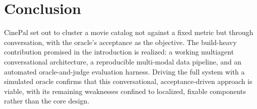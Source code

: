\section{Conclusion}\label{sec:conclusion}
CinePal set out to cluster a movie catalog not against a fixed metric but through conversation, with the oracle's acceptance as the objective.
The build-heavy contribution promised in the introduction is realized: a working multiagent conversational architecture, a reproducible multi-modal data pipeline, and an automated oracle-and-judge evaluation harness. 
Driving the full system with a simulated oracle confirms that this conversational, acceptance-driven approach is viable, with its remaining weaknesses confined to localized, fixable components rather than the core design.